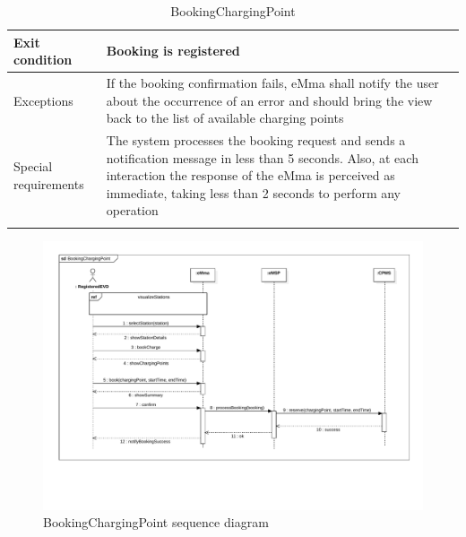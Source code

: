\begin{center}
\begin{longtable}{p{4cm} p{11cm}}
     \hline
     Exit condition &  Booking is registered\\
     \hline
     Exceptions &
        If the booking confirmation fails, eMma shall notify the user about the occurrence of an error and should bring the view back to the list of available charging points\\
     \hline
     Special requirements &  
        The system processes the booking request and sends a notification message in less than 5 seconds. Also, at each interaction the response of the eMma is perceived as immediate, taking less than 2 seconds to perform any operation\\
     \hline
    \caption{BookingChargingPoint}
    \label{tab:BookingChargingPoint}
    \end{longtable}
\end{center}
\begin{figure}[H]
    \centering
    \includegraphics[width=\textwidth, trim={0 3cm 0 0}, clip]{Images/cp3/seqDiagrams/BookChargingPoint.pdf}
    \caption{BookingChargingPoint sequence diagram}
\end{figure}

